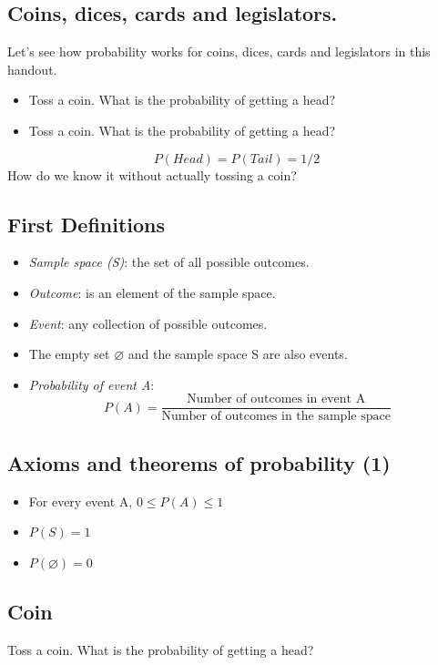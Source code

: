 \documentclass[11pt]{article}
\let\emptyset\varnothing
\begin{document}
	\subsection{Coins, dices, cards and legislators.}
	
	Let's see how probability works for coins, dices, cards and legislators in this handout.
	
		\begin{itemize}
			\item Toss a coin. What is the probability of getting a head?
			\item Toss a coin. What is the probability of getting a head?
		\end{itemize}
	\[P(Head) = P(Tail) = 1/2	\]
	How do we know it without actually tossing a coin?

	\subsection{First Definitions}
	\begin{itemize}
		\item \emph{Sample space (S)}: the set of all possible outcomes.
		\item \emph{Outcome}: is an element of the sample space.
		\item \emph{Event}: any collection of possible outcomes.
		\item The empty set $\emptyset$ and the sample space S are also events.	
		\item \emph{Probability of event A}:
			\[P(A) = \frac{\text{Number of outcomes in event A}}
			{\text{Number of outcomes in the sample space}}\]		
	\end {itemize}


	\subsection{Axioms and theorems of probability (1)}
	\begin{itemize}
		\item For every event A, $0 \leq P(A) \leq 1$
		\item $P(S) = 1$
		\item $P(\emptyset) = 0$
	\end{itemize}


	\subsection{Coin}
	Toss a coin. What is the probability of getting a head?\\
	
\end{document}
